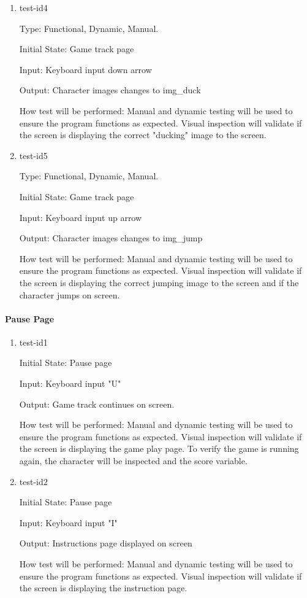 \documentclass[12pt, titlepage]{article}
\begin{document}
\begin{enumerate}
		\item{test-id4\\}
		
		Type: Functional, Dynamic, Manual.
		
		Initial State: Game track page
		
		Input: Keyboard input down arrow 
		
		Output: Character images changes to img\_duck
		
		How test will be performed: Manual and dynamic testing will be used to ensure the program functions as expected. Visual inspection will validate if the screen is displaying the correct "ducking" image to the screen.
		
		\item{test-id5\\}
		
		Type: Functional, Dynamic, Manual.
		
		Initial State: Game track page
		
		Input: Keyboard input up arrow
		
		Output: Character images changes to img\_jump
		
		How test will be performed: Manual and dynamic testing will be used to ensure the program functions as expected. Visual inspection will validate if the screen is displaying the correct jumping image to the screen and if the character jumps on screen.
		
		
		
	\end{enumerate}
	
	
	\paragraph{Pause Page}
	\begin{enumerate}
		\item{test-id1\\}
		
		Initial State: Pause page
		
		Input: Keyboard input "U"
		
		Output: Game track continues on screen. 
		
		How test will be performed: Manual and dynamic testing will be used to ensure the program functions as expected. Visual inspection will validate if the screen is displaying the game play page. To verify the game is running again, the character will be inspected and the score variable.  
		
		\item{test-id2\\}
		
		Initial State: Pause page
		
		Input: Keyboard input "I"
		
		Output: Instructions page displayed on screen 
		
		How test will be performed: Manual and dynamic testing will be used to ensure the program functions as expected. Visual inspection will validate if the screen is displaying the instruction page.
	\end{enumerate}
	
\end{document}
